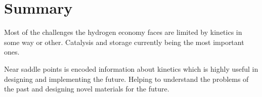 \section{Summary}
Most of the challenges the hydrogen economy faces are limited by kinetics in some way or other.
Catalysis and storage currently being the most important ones.

Near saddle points is encoded information about kinetics which is highly useful in designing and implementing the future.
Helping to understand the problems of the past and designing novel materials for the future.




